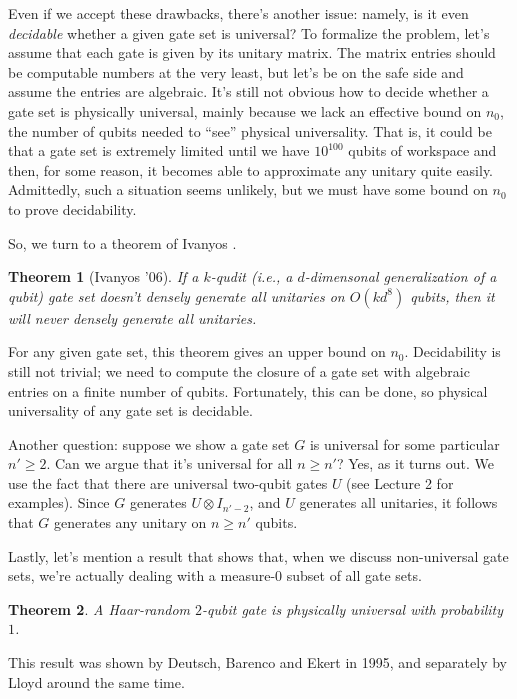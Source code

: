 \documentclass[11pt]{report}
\theoremstyle{plain}
\newtheorem{theorem}{Theorem}[section]
\theoremstyle{definition}
\begin{document}
Even if we accept these drawbacks, there's another issue: namely, is it even {\em decidable} whether a given gate set is universal? To formalize the problem, let's assume that each gate is given by its unitary matrix.  The matrix entries should be computable numbers at the very least, but let's be on the safe side and assume the entries are algebraic.  It's still not obvious how to decide whether a gate set is physically universal, mainly because we lack an effective bound on $n_0$, the number of qubits needed to ``see'' physical universality.  That is, it could be that a gate set is extremely limited until we have $10^{100}$ qubits of workspace and then, for some reason, it becomes able to approximate any unitary quite easily.  Admittedly, such a situation seems unlikely, but we must have some bound on $n_0$ to prove decidability.

So, we turn to a theorem of Ivanyos \cite{Ivanyos}.

\begin{theorem}[Ivanyos '06]
If a $k$-qudit (i.e., a $d$-dimensonal generalization of a qubit) gate set doesn't densely generate all unitaries on $O(kd^{8})$ qubits, then it will never densely generate all unitaries.
\end{theorem}

For any given gate set, this theorem gives an upper bound on $n_0$. Decidability is still not trivial; we need to compute the closure of a gate set with algebraic entries on a finite number of qubits. Fortunately, this can be done, so physical universality of any gate set is decidable.

Another question: suppose we show a gate set $G$ is universal for some particular $n' \geq 2$.  Can we argue that it's universal for all $n \geq n'$?  Yes, as it turns out.  We use the fact that there are universal two-qubit gates $U$ (see Lecture 2 for examples).  Since $G$ generates $U \otimes I_{n'-2}$, and $U$ generates all unitaries, it follows that $G$ generates any unitary on $n \geq n'$ qubits.

Lastly, let's mention a result that shows that, when we discuss non-universal gate sets, we're actually dealing with a measure-0 subset of all gate sets.

\begin{theorem}
A Haar-random $2$-qubit gate is physically universal with probability $1$.
\end{theorem}

This result was shown by Deutsch, Barenco and Ekert \cite{deutsch} in 1995, and separately by Lloyd \cite{lloyd} around the same time.
\end{document}
